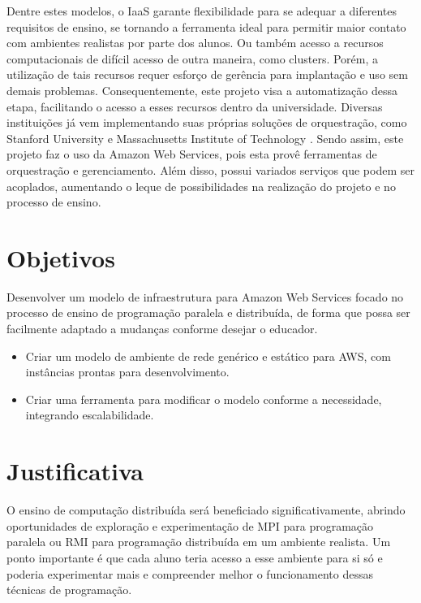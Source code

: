 \documentclass[tg]{mdtufsm}
\begin{document}
Dentre estes modelos, o IaaS garante flexibilidade para se adequar a diferentes requisitos de ensino, se tornando a ferramenta ideal para permitir maior contato com ambientes realistas por parte dos alunos. Ou também acesso a recursos computacionais de difícil acesso de outra maneira, como clusters. Porém, a utilização de tais recursos requer esforço de gerência para implantação e uso sem demais problemas. Consequentemente, este projeto visa a automatização dessa etapa, facilitando o acesso a esses recursos dentro da universidade. Diversas instituições já vem implementando suas próprias soluções de orquestração, como Stanford University e Massachusetts Institute of Technology \cite{stanford}. Sendo assim, este projeto faz o uso da Amazon Web Services, pois esta provê ferramentas de orquestração e gerenciamento. Além disso, possui variados serviços que podem ser acoplados, aumentando o leque de possibilidades na realização do projeto e no processo de ensino.

\section{Objetivos}

Desenvolver um modelo de infraestrutura para Amazon Web Services focado no processo de ensino de programação paralela e distribuída, de forma que possa ser facilmente adaptado a mudanças conforme desejar o educador.

\begin{itemize}
\item Criar um modelo de ambiente de rede genérico e estático para AWS, com instâncias prontas para desenvolvimento.
\item Criar uma ferramenta para modificar o modelo conforme a necessidade, integrando escalabilidade.
\end{itemize}

\section{Justificativa}

O ensino de computação distribuída será beneficiado significativamente, abrindo oportunidades de exploração e experimentação de MPI para programação paralela ou RMI para programação distribuída em um ambiente realista. Um ponto importante é que cada aluno teria acesso a esse ambiente para si só e poderia experimentar mais e compreender melhor o funcionamento dessas técnicas de programação.
\end{document}
